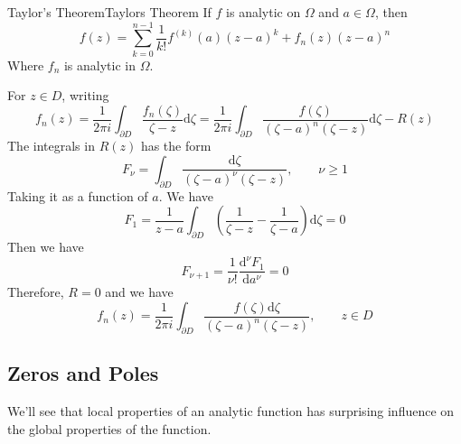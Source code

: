 \documentclass[../main.tex]{subfiles}
\begin{document}
\begin{theorem}{Taylor's Theorem}{Taylors Theorem}
	If $f$ is analytic on $\Omega$ and $a\in \Omega$, then
	\begin{equation*}
	f(z) = \sum_{k=0}^{n-1} \frac{1}{k!}f^{(k)}(a) (z-a)^k + f_n(z)(z-a)^n
	\end{equation*}
	Where $f_n$ is analytic in $\Omega$.
\end{theorem}
For $z\in D$, writing
\begin{equation*}
f_n(z) = \frac{1}{2 \pi i}\int_{\partial D} \frac{f_n(\zeta)}{\zeta-z}\mathrm{d} \zeta = \frac{1}{2 \pi i}\int_{\partial D} \frac{f(\zeta)}{(\zeta-a)^n(\zeta-z)} \mathrm{d} \zeta - R(z)
\end{equation*}
The integrals in $R(z)$ has the form
\begin{equation*}
F_{\nu} = \int_{\partial D} \frac{\mathrm{d} \zeta}{(\zeta-a)^{\nu}(\zeta-z)}, \qquad \nu \geq 1
\end{equation*}
Taking it as a function of $a$. We have
\begin{equation*}
F_1 = \frac{1}{z-a}\int_{\partial D} \left(\frac{1}{\zeta-z}-\frac{1}{\zeta-a}\right)\mathrm{d} \zeta = 0
\end{equation*}
Then we have
\begin{equation*}
F_{\nu+1} = \frac{1}{\nu!} \frac{\mathrm{d}^{\nu}F_1}{\mathrm{d} a^{\nu}} = 0
\end{equation*}
Therefore, $R=0$ and we have
\begin{equation}\label{eq:Evaluation of fn}
f_n(z) = \frac{1}{2 \pi i}\int_{\partial D} \frac{f(\zeta) \mathrm{d} \zeta}{(\zeta-a)^{n}(\zeta-z)}, \qquad z\in D
\end{equation}

\subsection{Zeros and Poles}
We'll see that local properties of an analytic function has surprising influence on the global properties of the function.
\end{document}
